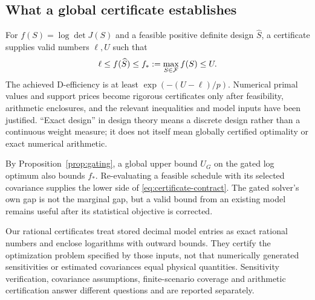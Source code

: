\subsection{What a global certificate establishes}
\label{subsec:certificate-contract}
For $f(S)=\log\det J(S)$ and a feasible positive definite design
$\widehat S$, a certificate supplies valid numbers $\ell,U$ such that
\begin{equation}
 \ell\le f(\widehat S)\le f_*:=\max_{S\in\mathcal F}f(S)\le U.
 \label{eq:certificate-contract}
\end{equation}
The achieved D-efficiency is at least $\exp(-(U-\ell)/p)$.
Numerical primal values and support prices become rigorous certificates only
after feasibility, arithmetic enclosures, and the relevant inequalities and
model inputs have been justified. ``Exact design'' in design theory means a
discrete design rather than a continuous weight measure; it does not itself
mean globally certified optimality or exact numerical arithmetic.

By Proposition~\ref{prop:gating}, a global upper bound $U_G$ on the gated
log optimum also bounds $f_*$. Re-evaluating a feasible schedule with its
selected covariance supplies the lower side of
\eqref{eq:certificate-contract}. The gated solver's own gap is not the
marginal gap, but a valid bound from an existing model remains useful after
its statistical objective is corrected.

Our rational certificates treat stored decimal model entries as exact
rational numbers and enclose logarithms with outward bounds. They certify
the optimization problem specified by those inputs, not that numerically
generated sensitivities or estimated covariances equal physical quantities.
Sensitivity verification, covariance assumptions, finite-scenario coverage
and arithmetic certification answer different questions and are reported
separately.
